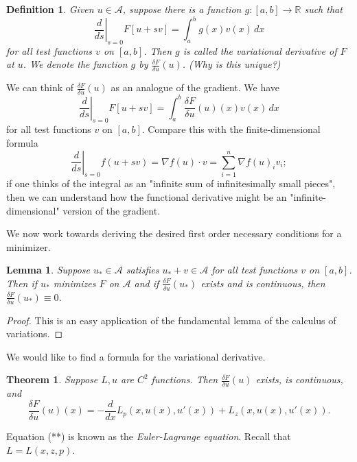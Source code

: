 \documentclass[11pt]{article}
\newcommand{\R}{\mathbb{R}}
\newtheorem{definition}{Definition}[subsection]
\newtheorem{theorem}{Theorem}[subsection]
\newtheorem{lemma}{Lemma}[subsection]
\begin{document}
\begin{definition}
Given $u \in \mathcal{A}$, suppose there is a function $g : [a,b] \to \R$ such that
\[
\left. \frac{d}{ds} \right|_{s = 0} F[u + sv] = \int_a^b g(x) v(x) \, dx
\]
for all test functions $v$ on $[a,b]$. Then $g$ is called the variational derivative of $F$ at $u$. We denote the function $g$ by $\frac{\delta F}{\delta u}(u)$. (Why is this unique?)
\end{definition}

We can think of $\frac{\delta F}{\delta u}(u)$ as an analogue of the gradient. We have
\[
\left. \frac{d}{ds} \right|_{s = 0} F[u + sv] = \int_a^b \frac{\delta F}{\delta u}(u)(x) v(x) \, dx
\]
for all test functions $v$ on $[a,b]$. Compare this with the finite-dimensional formula
\[
\left. \frac{d}{ds} \right|_{s=0} f(u + sv) = \nabla f(u) \cdot v = \sum_{i=1}^n \nabla f(u)_i v_i;
\]
if one thinks of the integral as an "infinite sum of infinitesimally small pieces", then we can understand how the functional derivative might be an "infinite-dimensional" version of the gradient.

We now work towards deriving the desired first order necessary conditions for a minimizer.

\begin{lemma}
Suppose $u_* \in \mathcal{A}$ satisfies $u_* + v \in \mathcal{A}$ for all test functions $v$ on $[a,b]$. Then if $u_*$ minimizes $F$ on $\mathcal{A}$ and if $\frac{\delta F}{\delta u}(u_*)$ exists and is continuous, then $\frac{\delta F}{\delta u}(u_*) \equiv 0$.
\end{lemma}
\begin{proof}
This is an easy application of the fundamental lemma of the calculus of variations.
\end{proof}

We would like to find a formula for the variational derivative.

\begin{theorem}
Suppose $L,u$ are $C^2$ functions. Then $\frac{\delta F}{\delta u}(u)$ exists, is continuous, and
\[
\tag{**}
\frac{\delta F}{\delta u}(u)(x) = -\frac{d}{dx} L_p(x,u(x), u'(x)) + L_z(x,u(x),u'(x)).
\]
\end{theorem}

Equation (**) is known as the \emph{Euler-Lagrange equation}. Recall that $L = L(x,z,p)$.
\end{document}
